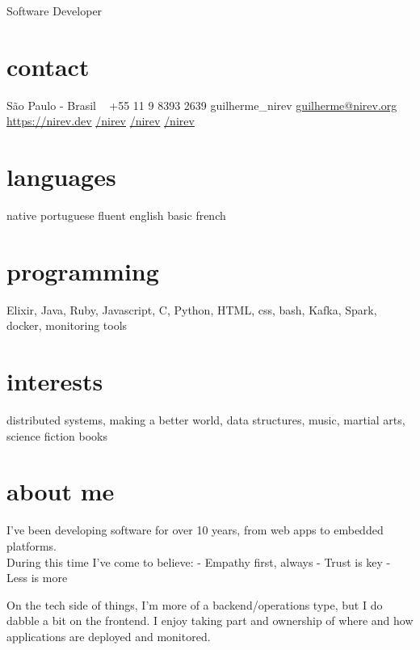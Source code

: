 \documentclass{nirev-cv}
\begin{document}
       {Software Developer}


\begin{aside}
  \section{contact}
    São Paulo - Brasil
    ~
    +55 11 9 8393 2639
    {\faSkype } guilherme\_nirev
    \href{mailto:guilherme@nirev.org}{guilherme@nirev.org}
    \href{https://nirev.dev}{https://nirev.dev}
    \href{https://github.com/nirev}{\faGithub /nirev}
    \href{https://twitter.com/nirev}{\faTwitter /nirev}
    \href{https://linkedin.com/in/nirev}{\faLinkedin /nirev}
  \section{languages}
    native portuguese
    fluent english
    basic french
  \section{programming}
    Elixir, Java, Ruby, Javascript, C, Python,
    HTML, css, bash,
    Kafka, Spark, docker, 
    monitoring tools
  \section{interests}
distributed systems, making a better world, data structures, music, martial arts, science fiction books
\end{aside}

\section{about me}

I've been developing software for over 10 years, from web apps to embedded platforms. \\
During this time I've come to believe:
- Empathy first, always
- Trust is key
- Less is more

On the tech side of things, I'm more of a backend/operations type, but I do dabble a bit on the frontend.
I enjoy taking part and ownership of where and how applications are deployed and monitored.
\end{document}
